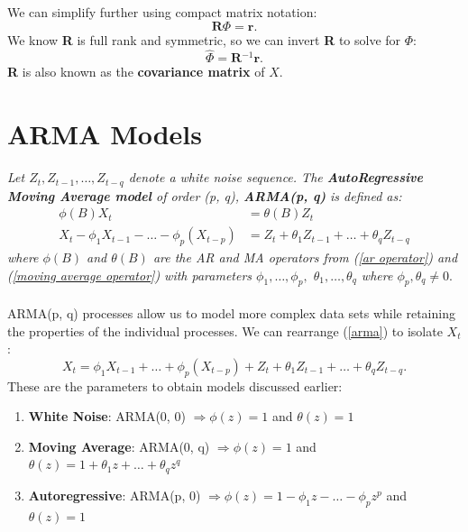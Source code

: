 \documentclass{article}
\begin{document}
We can simplify further using compact matrix notation:
\begin{equation}\label{yule walker matrix}
    \textbf{R$\Phi$}=\textbf{r}.
\end{equation}
We know \textbf{R} is full rank and symmetric, so we can invert \textbf{R} to solve for \textbf{$\Phi$}:
\begin{equation}
    \hat{\textbf{$\Phi$}} = \textbf{R$^{-1}$r.}
\end{equation}
\textbf{R} is also known as the \textbf{covariance matrix} of $X$.

\section{ARMA Models}
\textit{Let $Z_t, Z_{t-1}, \ldots, Z_{t-q}$ denote a white noise sequence. The \textbf{AutoRegressive Moving Average model} of order (p, q), \textbf{ARMA(p, q)} is defined as:
\begin{align}\label{arma}
    \phi(B)X_t &= \theta(B)Z_t \nonumber\\
    X_t - \phi_1 X_{t-1} - \ldots - \phi_p(X_{t-p}) &= Z_t + \theta_1 Z_{t-1} + \ldots + \theta_q Z_{t-q}
\end{align}
where $\phi(B)$ and $\theta(B)$ are the AR and MA operators from (\ref{ar operator}) and (\ref{moving average operator}) with parameters $\phi_1, \ldots, \phi_p,$ $\theta_1, \ldots, \theta_q$ where $\phi_p, \theta_q \neq 0.$
}\\\\
ARMA(p, q) processes allow us to model more complex data sets while retaining the properties of the individual processes. We can rearrange (\ref{arma}) to isolate $X_t$:
\begin{equation}\label{arma isolate}
    X_t = \phi_1 X_{t-1} + \ldots + \phi_p(X_{t-p}) + Z_t + \theta_1 Z_{t-1} + \ldots + \theta_q Z_{t-q}.
\end{equation}
 These are the parameters to obtain models discussed earlier:
 \begin{enumerate}
     \item \textbf{White Noise}: ARMA(0, 0) $\Longrightarrow \phi(z)=1$ and $\theta(z)=1$
     \item \textbf{Moving Average}: ARMA(0, q) $\Longrightarrow \phi(z)=1$ and $\theta(z)=1+\theta_1 z + \ldots + \theta_q z^q$
     \item \textbf{Autoregressive}: ARMA(p, 0) $\Longrightarrow \phi(z)=1 - \phi_1z - \ldots - \phi_pz^p$ and $\theta(z)=1$
 \end{enumerate}
\end{document}
